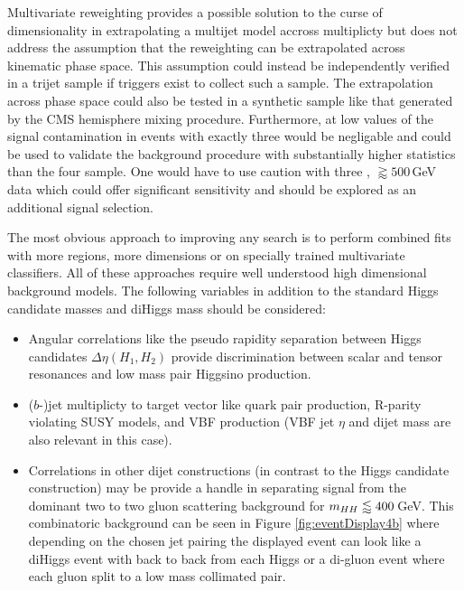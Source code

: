 Multivariate reweighting provides a possible solution to the curse of dimensionality in extrapolating a multijet model accross \bjet multiplicty but
does not address the assumption that the reweighting can be extrapolated across kinematic phase space.
This assumption could instead be independently verified in a trijet sample if triggers exist to collect such a sample.
The extrapolation across phase space could also be tested in a synthetic sample like that generated by the CMS hemisphere mixing procedure.
Furthermore, at low values of \mhh the signal contamination in events with exactly three \bjets would be negligable and could be used to validate the background procedure with substantially higher statistics than the four \bjet sample.
One would have to use caution with three \bjet, \mhh$\gtrapprox 500\,$GeV data which could offer significant sensitivity and should be explored as an additional signal selection.

The most obvious approach to improving any search is to perform combined fits with more regions, more dimensions or on specially trained multivariate classifiers.
All of these approaches require well understood high dimensional background models.
The following variables in addition to the standard Higgs candidate masses and diHiggs mass \mhh should be considered:
\begin{itemize}
\item Angular correlations like the pseudo rapidity separation between Higgs candidates $\Delta\eta(H_1,H_2)$ provide discrimination between scalar and tensor resonances and low mass pair Higgsino production.
\item ($b$-)jet multiplicty to target vector like quark pair production, R-parity violating SUSY models, and VBF \hh production (VBF jet $\eta$ and dijet mass are also relevant in this case).
\item Correlations in other dijet constructions (in contrast to the Higgs candidate construction) may be provide a handle in separating signal
  from the dominant two to two gluon scattering background for $m_{HH}\lessapprox 400\,$GeV.
  This combinatoric background can be seen in Figure \ref{fig:eventDisplay4b} where depending on the chosen jet pairing
  the displayed event can look like a diHiggs event with back to back \bjets from each Higgs or a di-gluon event where each gluon split to a low mass collimated \bb pair. 
\end{itemize}

